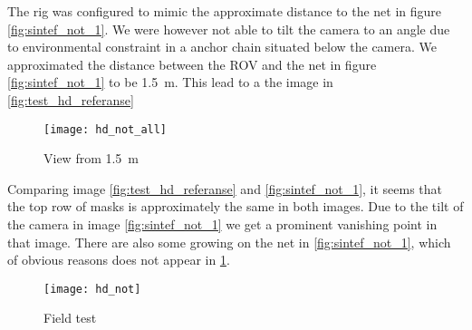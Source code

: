 The rig was configured to mimic the approximate distance to the net 
in figure \vref{fig:sintef_not_1}. We were however not able to tilt the camera to 
an angle due to environmental constraint in a anchor chain situated below the camera.
We approximated the distance between the ROV and the net in figure \vref{fig:sintef_not_1} to be 
\SI{1.5}{\metre}. This lead to a the image in \vref{fig:test_hd_referanse}

\begin{figure}[htbp]
	\centering
	\texttt{[image: hd\_not\_all]}
	\caption{View from \SI{1.5}{\metre}}
	\label{fig:test_hd_referanse}
\end{figure}

Comparing image \vref{fig:test_hd_referanse} and \vref{fig:sintef_not_1}, it seems that the 
top row of masks is approximately the same in both images. Due to the tilt of the 
camera in image \ref{fig:sintef_not_1} we get a prominent vanishing point in that image. There 
are also some growing on the net in \ref{fig:sintef_not_1}, which of obvious reasons does not appear 
in \ref{fig:test_hd_referanse}.

\begin{figure}[htbp]
	\centering
	\texttt{[image: hd\_not]}
	\caption{Field test}
	\label{fig:test_hd_clip}
\end{figure}
